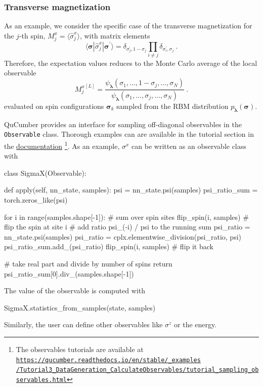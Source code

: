 \documentclass[submission, Phys, hidelnks]{SciPost}
\begin{document}
\subsubsection{Transverse magnetization}\label{subsubsec:sigmax}
As an example, we consider the specific case of the transverse magnetization for the $j$-th spin, $M_j^x=\langle\hat{\sigma}^x_j\rangle$, with matrix elements
\begin{equation}
    \langle\bm{\sigma}|\hat{\sigma}^x_j|\bm{\sigma}^{\prime}\rangle=\delta_{\sigma_j^\prime,1-\sigma_j}\prod_{i\ne j}\delta_{\sigma_i^\prime,\sigma_j}\:.
\end{equation}
Therefore, the expectation values reduces to the Monte Carlo average of the local observable
\begin{equation}
    {M_j^x}^{[L]}=\frac{\psi_{\bm{\lambda}}(\sigma_1,\dots,1-\sigma_j,\dots,\sigma_N)}
    {\psi_{\bm{\lambda}}(\sigma_1,\dots,\sigma_j,\dots,\sigma_N)} 
\:.
\end{equation}
evaluated on spin configurations $\bm{\sigma}_k$ sampled from the RBM distribution $p_{\bm{\lambda}}(\bm{\sigma})$. 

QuCumber provides an interface for sampling off-diagonal observables in the \verb|Observable| class. Thorough examples can are available in the tutorial section in the \href{https://qucumber.readthedocs.io/en/stable/}{documentation}\!\!
\footnote{The observables tutorials are available at
    \href{https://qucumber.readthedocs.io/en/stable/\_examples/Tutorial3\_DataGeneration\_CalculateObservables/tutorial\_sampling\_observables.html
}{\texttt{https://qucumber.readthedocs.io/en/stable/\_examples\\/Tutorial3\_DataGeneration\_CalculateObservables/tutorial\_sampling\_observables.html}}
}. 
As an example, $\sigma^x$ can be written as an observable class with
\begin{python}
class SigmaX(Observable):

    def apply(self, nn_state, samples):
        psi = nn_state.psi(samples)
        psi_ratio_sum = torch.zeros_like(psi)

        for i in range(samples.shape[-1]):  # sum over spin sites
            flip_spin(i, samples)  # flip the spin at site i
            # add ratio psi_(-i) / psi to the running sum
            psi_ratio = nn_state.psi(samples)
            psi_ratio = cplx.elementwise_division(psi_ratio, psi)
            psi_ratio_sum.add_(psi_ratio)
            flip_spin(i, samples)  # flip it back

        # take real part and divide by number of spins
        return psi_ratio_sum[0].div_(samples.shape[-1])
\end{python}
The value of the observable is computed with 
\begin{python}
SigmaX.statistics_from_samples(state, samples)
\end{python}
Similarly, the user can define other observables like $\sigma^z$ or the energy. 
\end{document}
